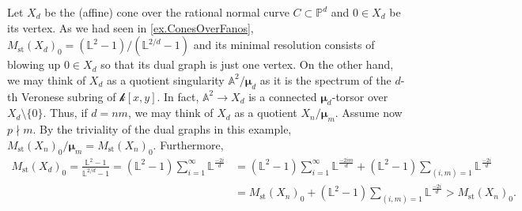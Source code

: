 \documentclass[12pt]{amsart}
\theoremstyle{plain}   %
\theoremstyle{definition}    %
\theoremstyle{remark}    %
\numberwithin{equation}{theorem}
\DeclareMathOperator{\st}{\mathrm{st}}
\newcommand{\kay}{\mathcal{k}}
\newcommand{\bA}{\mathbb{A}}
\newcommand{\bL}{\mathbb{L}}
\newcommand{\bP}{\mathbb{P}}
\begin{document}
\begin{example} \label{ex.ConesOverRationalNormalCurves}
Let $X_d$ be the (affine) cone over the rational normal curve $C \subset \bP^d$ and $0\in X_d$ be its vertex. As we had seen in \autoref{ex.ConesOverFanos}, $M_{\st}(X_d)_0 = (\bL^2-1)/(\bL^{2/d}-1)$ and its minimal resolution consists of blowing up $0 \in X_d$ so that its dual graph is just one vertex. On the other hand, we may think of $X_d$ as a quotient singularity $\bA^2/\bm{\mu}_d$ as it is the spectrum of the $d$-th Veronese subring of $\kay[x,y]$. In fact, $\bA^2 \to X_d$ is a connected $\bm{\mu}_d$-torsor over $X_d \setminus \{0\}$. Thus, if $d=nm$, we may think of $X_d$ as a quotient $X_n/\bm{\mu}_m$. Assume now $p\nmid m$. By the triviality of the dual graphs in this example, $M_{\st}(X_n)_0/\bm{\mu}_m = M_{\st}(X_n)_0$. Furthermore,
\begin{align*}
M_{\st}(X_d)_0 = \frac{\bL^2-1}{\bL^{2/d}-1} = (\bL^2-1)\sum_{i=1}^{\infty} \bL^{\frac{-2i}{d}} &= (\bL^2-1)\sum_{i=1}^{\infty} \bL^{\frac{-2im}{d}} + (\bL^2-1)\sum_{(i,m)=1} \bL^{\frac{-2i}{d}}\\
&= M_{\st}(X_n)_0 +(\bL^2-1)\sum_{(i,m)=1} \bL^{\frac{-2i}{d}} > M_{\st}(X_n)_0.
\end{align*}
\end{example}
\end{document}
